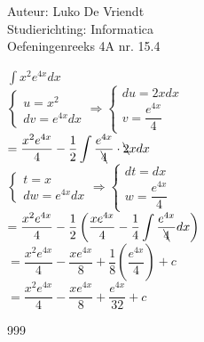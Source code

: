 \documentclass[a4paper]{article}
\begin{document}
\noindent \large Auteur: Luko De Vriendt\\
\noindent \large Studierichting: Informatica\\
\noindent \large Oefeningenreeks 4A nr. 15.4\\

\medskip

\normalsize

$\displaystyle \int x^2e^{4x}dx$ \\

$\left \{
\begin{array}{l}
     u = x^2 \\
     dv = e^{4x}dx
\end{array}
\right .
\Rightarrow
\left \{
\begin{array}{l}
     du = 2xdx \\
     v = \dfrac{e^{4x}}{4}
\end{array}
\right .$ \\

$= \dfrac{x^2e^{4x}}{4} - \dfrac{1}{2} \displaystyle \int \dfrac{e^{4x}}{\bcancel4} \cdot \bcancel2xdx$ \\

$\left \{
\begin{array}{l}
     t = x \\
     dw = e^{4x}dx
\end{array}
\right .
\Rightarrow
\left \{
\begin{array}{l}
     dt = dx \\
     w = \dfrac{e^{4x}}{4}
\end{array}
\right .$ \\

$= \dfrac{x^2e^{4x}}{4} - \dfrac{1}{2} \left ( \dfrac{xe^{4x}}{4} - \dfrac{1}{4} \displaystyle \int \dfrac{e^{4x}}{\bcancel4}dx \right )$ \\

$= \dfrac{x^2e^{4x}}{4} - \dfrac{xe^{4x}}{8} + \dfrac{1}{8} \left ( \dfrac{e^{4x}}{4} \right ) + c$ \\

$= \dfrac{x^2e^{4x}}{4} - \dfrac{xe^{4x}}{8} + \dfrac{e^{4x}}{32} + c$ \\


\begin{thebibliography}{999}
\end{thebibliography}
\end{document}
